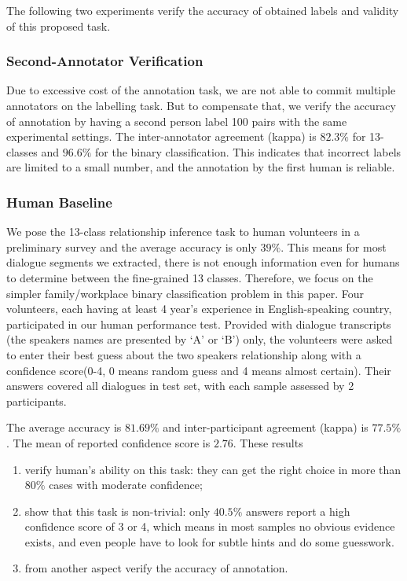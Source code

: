 The following two experiments verify the accuracy of obtained 
labels and validity of this proposed task.

\subsubsection*{Second-Annotator Verification}
Due to excessive cost of the annotation task, 
we are not able to commit multiple annotators on the labelling task. 
But to compensate that, we verify the accuracy of annotation by 
having a second person label 100 pairs with the same experimental settings. 
The inter-annotator agreement (kappa) is $82.3\%$ for 13-classes and $96.6\%$ for 
the binary classification. 
This indicates that incorrect labels are limited to a small number, and the annotation by the first human is 
reliable.


\subsubsection*{Human Baseline}
We pose the 13-class relationship inference task to human volunteers in a preliminary survey and the average accuracy is only $39\%$. This means for most dialogue segments we extracted, there is not enough information even for humans to determine between the fine-grained 13 classes. 
Therefore, we focus on the simpler family/workplace binary 
classification problem in this paper. 
Four volunteers, each having at least 4 year's experience in English-speaking 
country, participated in our human performance test. 
Provided with dialogue transcripts (the speakers 
names are presented by `A' or `B') only, the volunteers were asked to 
enter their best guess about the two speakers relationship along with 
a confidence score(0-4, 0 means random guess and 4 means almost certain). 
Their answers covered all dialogues in test set, 
with each sample assessed by 2 participants.

The average accuracy is $81.69\%$ and  
inter-participant agreement (kappa) is $77.5\%$. 
The mean of reported confidence score is $2.76$. 
These results 
\begin{enumerate}[label=(\roman*)]
	\item verify human's ability on this task: they can get the right choice in more than $80\%$ cases with moderate confidence;
	\item show that this task is non-trivial: 
	only $40.5\%$ answers report a high confidence score of 3 or 4, 
	which means in most samples no obvious evidence exists,
	and even people have to look for subtle hints and do some guesswork.
	\item from another aspect verify the accuracy of annotation.
\end{enumerate}

